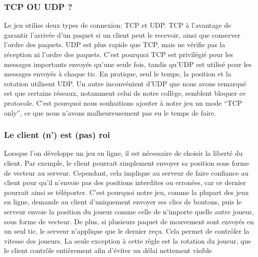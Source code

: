 \documentclass[a4paper]{article}
\begin{document}
\subsubsection{TCP OU UDP ?}
Le jeu utilise deux types de connexion: TCP et UDP. TCP à l’avantage de garantir l'arrivée d’un paquet si un client peut le recevoir, ainsi que conserver l’ordre des paquets. UDP est plus rapide que TCP, mais ne vérifie pas la réception ni l’ordre des paquets. C’est pourquoi TCP est privilégié pour les messages importants envoyés qu'une seule fois, tandis qu’UDP est utilisé pour les messages envoyés à chaque tic. En pratique, seul le temps, la position et la rotation utilisent UDP. Un autre inconvénient d’UDP que nous avons remarqué est que certains réseaux, notamment celui de notre collège, semblent bloquer ce protocole. C’est pourquoi nous souhaitions ajouter à notre jeu un mode “TCP only”, ce que nous n'avons malheureusement pas eu le temps de faire.

\subsubsection{Le client (n’) est (pas) roi}
Lorsque l’on développe un jeu en ligne, il est nécessaire de choisir la liberté du client. Par exemple, le client pourrait simplement envoyer sa position sous forme de vecteur au serveur. Cependant, cela implique au serveur de faire confiance au client pour qu’il n’envoie pas des positions interdites ou erronées, car ce dernier pourrait ainsi se téléporter. C’est pourquoi notre jeu, comme la plupart des jeux en ligne, demande au client d’uniquement envoyer ses clics de boutons, puis le serveur envoie la position du joueur comme celle de n’importe quelle autre joueur, sous forme de vecteur. De plus, si plusieurs paquet de mouvement sont envoyés en un seul tic, le serveur n’applique que le dernier reçu. Cela permet de contrôler la vitesse des joueurs. La seule exception à cette règle est la rotation du joueur, que le client contrôle entièrement afin d’éviter un délai nettement visible
\end{document}
